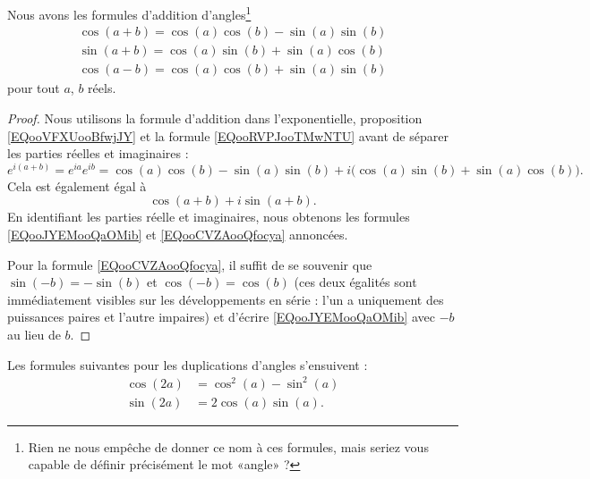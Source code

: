 \begin{lemma}       \label{LEMooJAWBooJGfZIL}
    Nous avons les formules d'addition d'angles\footnote{Rien ne nous empêche de donner ce nom à ces formules, mais seriez vous capable de définir précisément le mot «angle» ?}
    \begin{subequations}        \label{SUBEQSooFSSMooHcYwRc}
        \begin{align}
            \cos(a+b)=\cos(a)\cos(b)-\sin(a)\sin(b) \label{EQooJYEMooQaOMib}\\
            \sin(a+b)=\cos(a)\sin(b)+\sin(a)\cos(b) \label{EQooECAUooQzckDv}\\
            \cos(a-b)=\cos(a)\cos(b)+\sin(a)\sin(b) \label{EQooCVZAooQfocya}
        \end{align}
    \end{subequations}
    pour tout \( a\), \( b\) réels.
\end{lemma}

\begin{proof}
    Nous utilisons la formule d'addition dans l'exponentielle, proposition \eqref{EQooVFXUooBfwjJY} et la formule \eqref{EQooRVPJooTMwNTU} avant de séparer les parties réelles et imaginaires :
    \begin{equation}
        e^{i(a+b)}= e^{ia} e^{ib}=\cos(a)\cos(b)-\sin(a)\sin(b)+i\big( \cos(a)\sin(b)+\sin(a)\cos(b) \big).
    \end{equation}
    Cela est également égal à
    \begin{equation}
        \cos(a+b)+i\sin(a+b).
    \end{equation}
    En identifiant les parties réelle et imaginaires, nous obtenons les formules \eqref{EQooJYEMooQaOMib} et \eqref{EQooCVZAooQfocya} annoncées.

    Pour la formule \eqref{EQooCVZAooQfocya}, il suffit de se souvenir que \( \sin(-b)=-\sin(b)\) et \( \cos(-b)=\cos(b)\) (ces deux égalités sont immédiatement visibles sur les développements en série : l'un a uniquement des puissances paires et l'autre impaires) et d'écrire \eqref{EQooJYEMooQaOMib} avec \( -b\) au lieu de \( b\).
\end{proof}

\begin{corollary}       \label{CORooQZDQooWjMXTF}
    Les formules suivantes pour les duplications d'angles s'ensuivent :
    \begin{subequations}
        \begin{align}
            \cos(2a)&=\cos^2(a)-\sin^2(a)\\
            \sin(2a)&=2\cos(a)\sin(a).      \label{SUBEQooLRJDooQuFvux}
        \end{align}
    \end{subequations}
\end{corollary}

